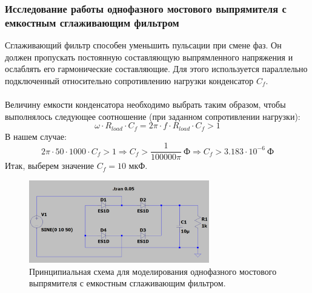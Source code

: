 \documentclass[12pt]{article}
\begin{document}
\subsubsection*{Исследование работы однофазного мостового выпрямителя с емкостным сглаживающим фильтром}
Сглаживающий фильтр способен уменьшить пульсации при смене фаз. Он должен пропускать постоянную составляющую выпрямленного напряжения и ослаблять его гармонические составляющие. Для этого используется параллельно подключенный относительно сопротивлению нагрузки конденсатор $C_f$.\\
\ \\
Величину емкости конденсатора необходимо выбрать таким образом, чтобы выполнялось следующее соотношение (при заданном сопротивлении нагрузки):
\[
\omega \cdot R_{load} \cdot C_f = 2 \pi \cdot f \cdot R_{load} \cdot C_f > 1
\]
В нашем случае:
\[
2 \pi \cdot 50 \cdot 1000 \cdot C_f > 1 \Rightarrow C_f > \frac{1}{100 000\pi} \ \text{Ф} \Rightarrow C_f > 3.183\cdot10^{-6} \ \text{Ф}
\]
Итак, выберем значение $C_f = 10$ мкФ.

\begin{figure}[H]
    \centering
    \includegraphics[width=0.7\textwidth]{4_circuits_scheme.png}
    \caption{Принципиальная схема для моделирования однофазного мостового выпрямителя с емкостным сглаживающим фильтром.}
    \label{fig:4_circuits_scheme.png}
\end{figure}\\
\end{document}

